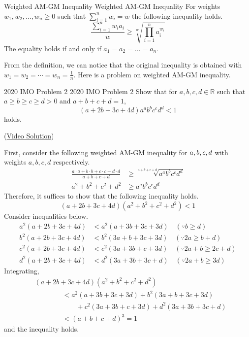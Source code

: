 \documentclass[../../../main.tex]{subfiles}
\begin{document}
\begin{definition}
{Weighted AM-GM Inequality}
{Weighted AM-GM Inequality}
For weights $w_1, w_2, \dots, w_n \geq 0$ such that
$\sum_{i=1}^n w_i = w$ the following inequality holds.
\[
\frac{\sum_{i=1}^n w_i a_i}{w}
\geq \sqrt[w]{\prod_{i=1}^n a_i^{w_i}}
\]
The equality holds if and only if $a_1 = a_2 = \dots = a_n$.
\end{definition}

From the definition, we can notice that the original inequality is
obtained with $w_1 = w_2 = \cdots = w_n = \frac{1}{n}$. Here is
a problem on weighted AM-GM inequality.

\begin{problem}{2020 IMO Problem 2 \medium}{2020 IMO Problem 2}
Show that for $a, b, c, d \in \mathbb{R}$ such that
$a \geq b \geq c \geq d > 0$ and $a + b + c + d = 1$,
\[
(a + 2b + 3c + 4d) a^a b^b c^c d^d < 1
\]
holds.
\end{problem}
(\href{https://youtu.be/Vz9BC5q7zdc}{Video Solution})
\begin{solution}
First, consider the following weighted AM-GM inequality for
$a, b, c, \linebreak d$ with weights $a, b, c, d$ respectively.
\begin{align*}
    \frac{a \cdot a + b \cdot b + c \cdot c + d \cdot d}
        {a + b + c + d}
    &\geq \sqrt[a + b + c + d]{a^a b^b c^c d^d} \\
    a^2 + b^2 + c^2 + d^2
    &\geq a^a b^b c^c d^d
\end{align*}
Therefore, it suffices to show that the following inequality holds.
\[
(a + 2b + 3c + 4d)(a^2 + b^2 + c^2 + d^2) < 1
\]
Consider inequalities below.
\begin{align*}
    a^2 (a + 2b + 3c + 4d)
    &< a^2 (a + 3b + 3c + 3d) \quad (\because b \geq d) \\
    b^2 (a + 2b + 3c + 4d)
    &< b^2 (3a + b + 3c + 3d) \quad (\because 2a \geq b + d) \\
    c^2 (a + 2b + 3c + 4d)
    &< c^2 (3a + 3b + c + 3d) \quad (\because 2a + b \geq 2c + d) \\
    d^2 (a + 2b + 3c + 4d)
    &< d^2 (3a + 3b + 3c + d) \quad (\because 2a + b \geq 3d)
\end{align*}
Integrating,
\begin{align*}
    &(a + 2b + 3c + 4d)(a^2 + b^2 + c^2 + d^2) \\
    &\qquad\qquad< a^2 (a + 3b + 3c + 3d) + b^2 (3a + b + 3c + 3d) \\
    &\qquad\qquad\qquad + c^2 (3a + 3b + c + 3d) +
        d^2 (3a + 3b + 3c + d) \\
    &\qquad\qquad < (a + b + c + d)^3 = 1
\end{align*}
and the inequality holds.
\end{solution}
\end{document}
